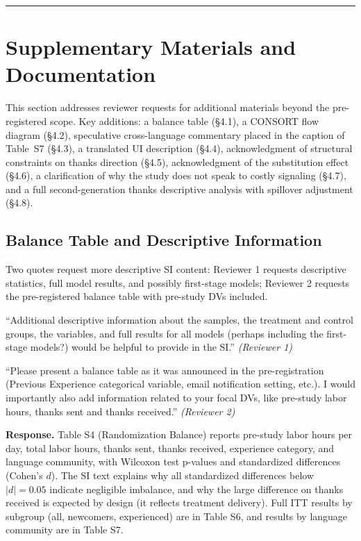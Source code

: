 \documentclass[12pt]{article}
\newenvironment{reviewquote}{%
  \def\FrameCommand{{\color{quotebarcolor}\vrule width 2pt}\colorbox{quotebg}}%
  \MakeFramed{\advance\hsize-\width \FrameRestore}%
  \small
}{%
  \endMakeFramed
}
\newcommand{\sectionnote}[1]{\par\smallskip#1\par\medskip}
\begin{document}
\bigskip\hrule\bigskip

\section{Supplementary Materials and Documentation}

\sectionnote{This section addresses reviewer requests for additional materials beyond the pre-registered scope. Key additions: a balance table (\S4.1), a CONSORT flow diagram (\S4.2), speculative cross-language commentary placed in the caption of Table~S7 (\S4.3), a translated UI description (\S4.4), acknowledgment of structural constraints on thanks direction (\S4.5), acknowledgment of the substitution effect (\S4.6), a clarification of why the study does not speak to costly signaling (\S4.7), and a full second-generation thanks descriptive analysis with spillover adjustment (\S4.8).}

\subsection{Balance Table and Descriptive Information}

\sectionnote{Two quotes request more descriptive SI content: Reviewer 1 requests descriptive statistics, full model results, and possibly first-stage models; Reviewer 2 requests the pre-registered balance table with pre-study DVs included.}

\begin{reviewquote}
``Additional descriptive information about the samples, the treatment and control groups, the variables, and full results for all models (perhaps including the first-stage models?) would be helpful to provide in the SI.'' \textit{(Reviewer 1)}
\end{reviewquote}

\begin{reviewquote}
``Please present a balance table as it was announced in the pre-registration (Previous Experience categorical variable, email notification setting, etc.). I would importantly also add information related to your focal DVs, like pre-study labor hours, thanks sent and thanks received.'' \textit{(Reviewer 2)}
\end{reviewquote}

\textbf{Response.} Table S4 (Randomization Balance) reports pre-study labor hours per day, total labor hours, thanks sent, thanks received, experience category, and language community, with Wilcoxon test p-values and standardized differences (Cohen's $d$). The SI text explains why all standardized differences below $|d| = 0.05$ indicate negligible imbalance, and why the large difference on thanks received is expected by design (it reflects treatment delivery). Full ITT results by subgroup (all, newcomers, experienced) are in Table S6, and results by language community are in Table S7.
\end{document}
